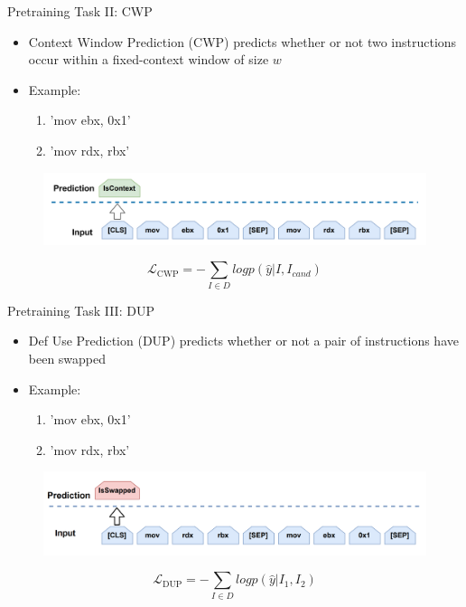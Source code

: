 \documentclass{beamer}
\begin{document}
\begin{frame}{Pretraining Task II: CWP}
	
	\begin{itemize}
		\item Context Window Prediction (CWP) predicts whether or not two instructions occur within a fixed-context window of size $w$
		\item Example:
		\begin{enumerate}
			\item 'mov ebx, 0x1'
			\item 'mov rdx, rbx'
		\end{enumerate}
	\end{itemize}

	\begin{figure}[h]
	\includegraphics[scale=.25]{images/context-window-prediction.png}
	\end{figure}

	$$\mathcal{L}_{\textrm{CWP}} = - \sum_{I \in D} log{p(\hat{y} | I, I_{cand})}$$

\end{frame}

\begin{frame}{Pretraining Task III: DUP}
	
	\begin{itemize}
		\item Def Use Prediction (DUP) predicts whether or not a pair of instructions have been swapped
		\item Example:
		\begin{enumerate}
			\item 'mov ebx, 0x1'
			\item 'mov rdx, rbx'
		\end{enumerate}
	\end{itemize}

	\begin{figure}[h]
	\includegraphics[scale=.3]{images/def-use-prediction.png}
	\end{figure}

	$$\mathcal{L}_{\textrm{DUP}} = - \sum_{I \in D} log{p(\hat{y} | I_1, I_2)}$$
	
\end{frame}
\end{document}
